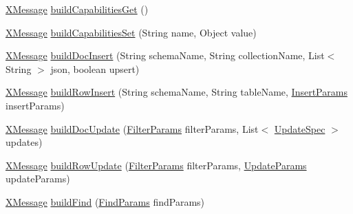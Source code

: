 \begin{DoxyCompactItemize}
\item 
\mbox{\hyperlink{classcom_1_1mysql_1_1cj_1_1protocol_1_1x_1_1_x_message}{X\+Message}} \mbox{\hyperlink{classcom_1_1mysql_1_1cj_1_1protocol_1_1x_1_1_x_message_builder_af5e34f66571b0fb764fea7592006ed32}{build\+Capabilities\+Get}} ()
\item 
\mbox{\hyperlink{classcom_1_1mysql_1_1cj_1_1protocol_1_1x_1_1_x_message}{X\+Message}} \mbox{\hyperlink{classcom_1_1mysql_1_1cj_1_1protocol_1_1x_1_1_x_message_builder_a19763fe5132b791e239585e6c579b424}{build\+Capabilities\+Set}} (String name, Object value)
\item 
\mbox{\hyperlink{classcom_1_1mysql_1_1cj_1_1protocol_1_1x_1_1_x_message}{X\+Message}} \mbox{\hyperlink{classcom_1_1mysql_1_1cj_1_1protocol_1_1x_1_1_x_message_builder_ae1ef598fc705f1ad12007f1961281561}{build\+Doc\+Insert}} (String schema\+Name, String collection\+Name, List$<$ String $>$ json, boolean upsert)
\item 
\mbox{\hyperlink{classcom_1_1mysql_1_1cj_1_1protocol_1_1x_1_1_x_message}{X\+Message}} \mbox{\hyperlink{classcom_1_1mysql_1_1cj_1_1protocol_1_1x_1_1_x_message_builder_a0004da51444c3ff97fbc092e9fa4ac38}{build\+Row\+Insert}} (String schema\+Name, String table\+Name, \mbox{\hyperlink{classcom_1_1mysql_1_1cj_1_1xdevapi_1_1_insert_params}{Insert\+Params}} insert\+Params)
\item 
\mbox{\hyperlink{classcom_1_1mysql_1_1cj_1_1protocol_1_1x_1_1_x_message}{X\+Message}} \mbox{\hyperlink{classcom_1_1mysql_1_1cj_1_1protocol_1_1x_1_1_x_message_builder_abec48224a549de8ccba9b21ad44edb18}{build\+Doc\+Update}} (\mbox{\hyperlink{classcom_1_1mysql_1_1cj_1_1xdevapi_1_1_filter_params}{Filter\+Params}} filter\+Params, List$<$ \mbox{\hyperlink{classcom_1_1mysql_1_1cj_1_1xdevapi_1_1_update_spec}{Update\+Spec}} $>$ updates)
\item 
\mbox{\hyperlink{classcom_1_1mysql_1_1cj_1_1protocol_1_1x_1_1_x_message}{X\+Message}} \mbox{\hyperlink{classcom_1_1mysql_1_1cj_1_1protocol_1_1x_1_1_x_message_builder_a16b907086f40db7465be3eedf12788ae}{build\+Row\+Update}} (\mbox{\hyperlink{classcom_1_1mysql_1_1cj_1_1xdevapi_1_1_filter_params}{Filter\+Params}} filter\+Params, \mbox{\hyperlink{classcom_1_1mysql_1_1cj_1_1xdevapi_1_1_update_params}{Update\+Params}} update\+Params)
\item 
\mbox{\hyperlink{classcom_1_1mysql_1_1cj_1_1protocol_1_1x_1_1_x_message}{X\+Message}} \mbox{\hyperlink{classcom_1_1mysql_1_1cj_1_1protocol_1_1x_1_1_x_message_builder_a3907b7f639b9a80350f731a96073a2d4}{build\+Find}} (\mbox{\hyperlink{interfacecom_1_1mysql_1_1cj_1_1xdevapi_1_1_find_params}{Find\+Params}} find\+Params)

\end{DoxyCompactItemize}
